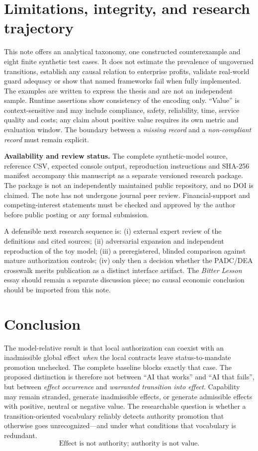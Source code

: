 \documentclass[11pt,a4paper]{article}
\begin{document}
\section{Limitations, integrity, and research trajectory}
This note offers an analytical taxonomy, one constructed counterexample and eight finite synthetic test cases. It does not estimate the prevalence of ungoverned transitions, establish any causal relation to enterprise profits, validate real-world guard adequacy or show that named frameworks fail when fully implemented. The examples are written to express the thesis and are not an independent sample. Runtime assertions show consistency of the encoding only. ``Value'' is context-sensitive and may include compliance, safety, reliability, time, service quality and costs; any claim about positive value requires its own metric and evaluation window. The boundary between a \emph{missing record} and a \emph{non-compliant record} must remain explicit.

\textbf{Availability and review status.} The complete synthetic-model source, reference CSV, expected console output, reproduction instructions and SHA-256 manifest accompany this manuscript as a separate versioned research package. The package is not an independently maintained public repository, and no DOI is claimed. The note has not undergone journal peer review. Financial-support and competing-interest statements must be checked and approved by the author before public posting or any formal submission.\par

A defensible next research sequence is: (i) external expert review of the definitions and cited sources; (ii) adversarial expansion and independent reproduction of the toy model; (iii) a preregistered, blinded comparison against mature authorization controls; (iv) only then a decision whether the PADC/DEA crosswalk merits publication as a distinct interface artifact. The \emph{Bitter Lesson} essay should remain a separate discussion piece; no causal economic conclusion should be imported from this note.

\section*{Conclusion}
The model-relative result is that local authorization can coexist with an inadmissible global effect \emph{when} the local contracts leave status-to-mandate promotion unchecked. The complete baseline blocks exactly that case. The proposed distinction is therefore not between ``AI that works'' and ``AI that fails'', but between \emph{effect occurrence} and \emph{warranted transition into effect}. Capability may remain stranded, generate inadmissible effects, or generate admissible effects with positive, neutral or negative value. The researchable question is whether a transition-oriented vocabulary reliably detects authority promotion that otherwise goes unrecognized---and under what conditions that vocabulary is redundant.
\begin{equation*}
\boxed{\text{Effect is not authority; authority is not value.}}
\end{equation*}
\end{document}
